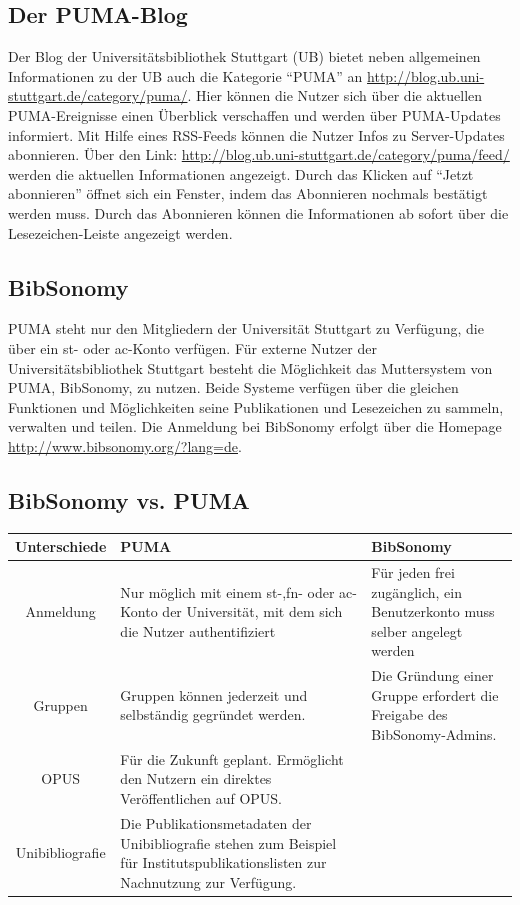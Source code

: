 \subsection{Der PUMA-Blog}
Der Blog der Universitätsbibliothek Stuttgart (UB) bietet neben allgemeinen Informationen zu der UB auch die Kategorie \enquote{PUMA} an {\url{http://blog.ub.uni-stuttgart.de/category/puma/}}. Hier können die Nutzer sich über die aktuellen PUMA-Ereignisse einen Überblick verschaffen und werden über PUMA-Updates informiert.\newline
Mit Hilfe eines RSS-Feeds können die Nutzer Infos zu Server-Updates abonnieren. Über den Link: \url{http://blog.ub.uni-stuttgart.de/category/puma/feed/} werden die aktuellen Informationen angezeigt. Durch das Klicken auf \enquote{Jetzt abonnieren} öffnet sich ein Fenster, indem das Abonnieren nochmals bestätigt werden muss. Durch das Abonnieren können die Informationen ab sofort über die Lesezeichen-Leiste angezeigt werden. 
\subsection{BibSonomy}
PUMA steht nur den Mitgliedern der Universität Stuttgart zu Verfügung, die über ein st- oder ac-Konto  verfügen. Für externe Nutzer der Universitätsbibliothek Stuttgart besteht die Möglichkeit das Muttersystem von PUMA, BibSonomy, zu nutzen. Beide Systeme verfügen über die gleichen Funktionen und Möglichkeiten seine Publikationen und Lesezeichen zu sammeln, verwalten und teilen. \newline
Die Anmeldung bei BibSonomy erfolgt über die Homepage \url{http://www.bibsonomy.org/?lang=de}. 

\subsection{BibSonomy vs. PUMA}
\small
\begin{longtable}{|c|m{4cm}|m{4cm}|}\hline
	\bfseries Unterschiede & \bfseries PUMA & \bfseries BibSonomy\\ \hline
	Anmeldung& Nur möglich mit einem st-,fn- oder ac-Konto der Universität, mit dem sich die Nutzer authentifiziert  & Für jeden frei zugänglich, ein Benutzerkonto muss selber angelegt werden \\ \hline
	 Gruppen\index{Gruppen} & Gruppen können jederzeit und selbständig gegründet werden. & Die Gründung einer Gruppe erfordert die Freigabe des BibSonomy-Admins. \\ \hline
	OPUS\index{OPUS} & Für die Zukunft geplant. Ermöglicht den Nutzern ein direktes Veröffentlichen auf OPUS. & \\ \hline
	Unibibliografie\index{Unibibliografie}& Die Publikationsmetadaten der Unibibliografie stehen zum Beispiel für Institutspublikationslisten zur Nachnutzung zur Verfügung.&\\ \hline
\end{longtable}
\normalsize
